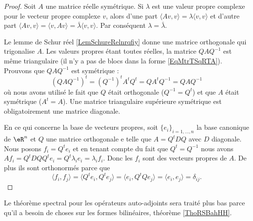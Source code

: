 \begin{proof}
    Soit \( A\) une matrice réelle symétrique. Si \( \lambda\) est une valeur propre complexe pour le vecteur propre complexe \( v\), alors d'une part \( \langle Av, v\rangle =\lambda\langle v, v\rangle \) et d'autre part \( \langle Av, v\rangle =\langle v, Av\rangle =\bar\lambda\langle v, v\rangle \). Par conséquent \( \lambda=\bar\lambda\).
    
    Le lemme de Schur réel \ref{LemSchureRelnrqfiy} donne une matrice orthogonale qui trigonalise \( A\). Les valeurs propres étant toutes réelles, la matrice \( QAQ^{-1}\) est même triangulaire (il n'y a pas de blocs dans la forme \eqref{EqMtrTSqRTA}). Prouvons que \( QAQ^{-1}\) est symétrique :
    \begin{equation}
        (QAQ^{-1})^t=(Q^{-1})^tA^tQ^t=QA^tQ^{-1}=QAQ^{-1}
    \end{equation}
    où nous avons utilisé le fait que \( Q\) était orthogonale (\( Q^{-1}=Q^t\)) et que \( A\) était symétrique (\( A^t=A\)). Une matrice triangulaire supérieure symétrique est obligatoirement une matrice diagonale.

    En ce qui concerne la base de vecteurs propres, soit \( \{ e_i \}_{i=1,\ldots, n}\) la base canonique de \( \eR^n\) et \( Q\) une matrice orthogonale e telle que \( A=Q^tDQ\) avec \( D\) diagonale. Nous posons \( f_i=Q^te_i\) et en tenant compte du fait que \( Q^t=Q^{-1}\) nous avons \( Af_i=Q^tDQQ^te_i=Q^t\lambda_i e_i=\lambda_if_i\). Donc les \( f_i\) sont des vecteurs propres de \( A\). De plus ils sont orthonormés parce que
    \begin{equation}
        \langle f_i, f_j\rangle =\langle Q^te_i, Q^te_j\rangle =\langle e_i, Q^tQe_j\rangle =\langle e_i, e_j\rangle =\delta_{ij}.
    \end{equation}
\end{proof}
Le théorème spectral pour les opérateurs auto-adjoints sera traité plus bas parce qu'il a besoin de choses sur les formes bilinéaires, théorème \ref{ThoRSBahHH}.

